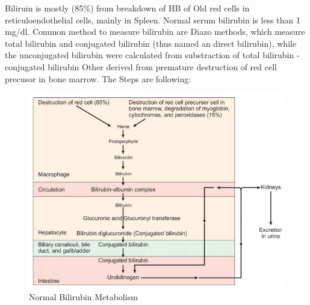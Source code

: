 \documentclass[
  letterpaper,
  DIV=11,
  numbers=noendperiod]{scrreprt}
\begin{document}
Biliruin is mostly (85\%) from breakdown of HB of Old red cells in
reticuloendothelial cells, mainly in Spleen. Normal serum bilirubin is
less than 1 mg/dl. Common method to measure bilirubin are Diazo methods,
which measure total bilirubin and conjugated bilirubin (thus named an
direct bilirubin), while the unconjugated bilirubin were calculated from
substraction of total bilirubin - conjugated bilirubin Other derived
from premature destruction of red cell precusor in bone marrow. The
Steps are following:

\begin{figure}

{\centering \includegraphics{image/bilirubin_normal.png}

}

\caption{Normal Bilirubin Metabolism}

\end{figure}%
\end{document}
